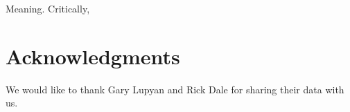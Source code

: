 \documentclass[10pt,letterpaper]{article}
\newcommand{\squeezeup}{\vspace{-1.5mm}}
\begin{document}
\cite{sapir1912language}
\cite{reali2014paradox}


\cite{lupyanrole}\cite{lupyan2010language}
\cite{kirby2008cumulative}
Meaning. \cite{silvey2015word}
\cite{perfors2011language}
Critically, 





\section{Acknowledgments}
We would like to thank Gary Lupyan and Rick Dale for sharing their data with us.




\setlength{\bibleftmargin}{.125in}
\setlength{\bibindent}{-\bibleftmargin}


\end{document}
